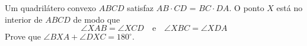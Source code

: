 Um quadrilátero convexo $ABCD$ satisfaz $AB \cdot CD$ = $BC \cdot DA$. O ponto $X$ está no
interior de $ABCD$ de modo que
$$\angle XAB = \angle XCD \quad \mathrm{e} \quad \angle XBC = \angle XDA$$
Prove que $\angle BXA + \angle DXC = 180^\circ$.
